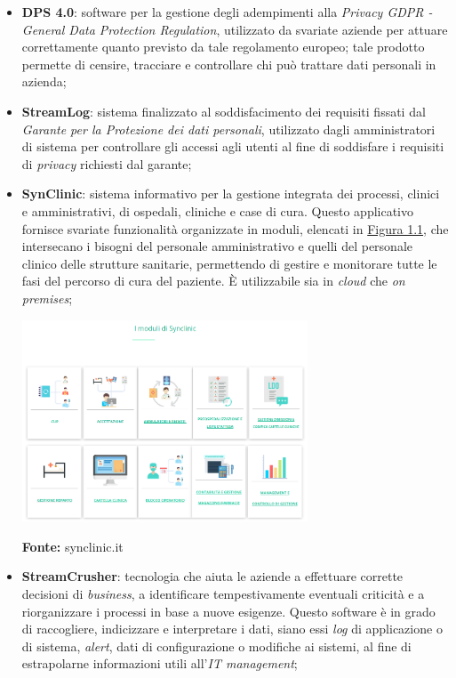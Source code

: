 \begin{itemize}
  \item \textbf{DPS 4.0}: software per la gestione degli adempimenti alla \textit{Privacy GDPR - General Data Protection Regulation}, utilizzato da svariate aziende per attuare correttamente quanto previsto da tale regolamento europeo; tale prodotto permette di censire, tracciare e controllare chi può trattare dati personali in azienda;

  \item \textbf{StreamLog}: sistema finalizzato al soddisfacimento dei requisiti fissati dal \textit{Garante per la Protezione dei dati personali}, utilizzato dagli amministratori di sistema per controllare gli accessi agli utenti al fine di soddisfare i requisiti di \textit{privacy} richiesti dal garante;

  \item \textbf{SynClinic}: sistema informativo per la gestione integrata dei processi, clinici e amministrativi, di ospedali, cliniche e case di cura. Questo applicativo fornisce svariate funzionalità organizzate in moduli, elencati in \hyperref[img:synclinic]{Figura 1.1}, che intersecano i bisogni del personale amministrativo e quelli del personale clinico delle strutture sanitarie, permettendo di gestire e monitorare tutte le fasi del percorso di cura del paziente. È utilizzabile sia in \textit{cloud} che \textit{on premises};

  \begin{minipage}{\linewidth}
    \centering
      \includegraphics[height=6cm]{immagini/synclinic}
          \label{img:synclinic}
    \caption*{\textbf{Fonte:} synclinic.it}
  \end{minipage}

  \item \textbf{StreamCrusher}: tecnologia che aiuta le aziende a effettuare corrette decisioni di \textit{business}, a identificare tempestivamente eventuali criticità e a riorganizzare i processi in base a nuove esigenze. Questo software è in grado di raccogliere, indicizzare e interpretare i dati, siano essi \textit{log} di applicazione o di sistema, \textit{alert}, dati di configurazione o modifiche ai sistemi, al fine di estrapolarne informazioni utili all'\textit{IT management};


\end{itemize}
